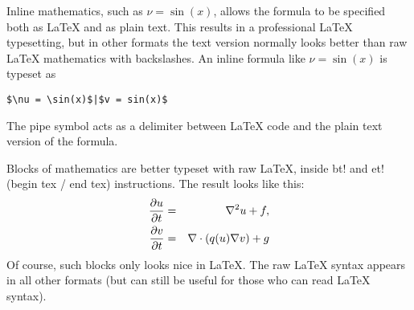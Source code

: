 \documentclass{article}
\begin{document}
Inline mathematics, such as $\nu = \sin(x)$,
allows the formula to be specified both as {\LaTeX} and as plain text.
This results in a professional {\LaTeX} typesetting, but in other formats
the text version normally looks better than raw {\LaTeX} mathematics with
backslashes. An inline formula like $\nu = \sin(x)$ is
typeset as
\begin{Verbatim}[fontsize=\fontsize{9pt}{9pt},tabsize=8,baselinestretch=0.85,
fontfamily=tt,xleftmargin=7mm]
$\nu = \sin(x)$|$v = sin(x)$
\end{Verbatim}
\noindent
The pipe symbol acts as a delimiter between {\LaTeX} code and the plain text
version of the formula.

Blocks of mathematics are better typeset with raw {\LaTeX}, inside
{\fontsize{10pt}{10pt}\verb!!bt!} and {\fontsize{10pt}{10pt}\verb!!et!} (begin tex / end tex) instructions. 
The result looks like this:
\begin{eqnarray}
{\partial u\over\partial t} &=& \nabla^2 u + f, \label{myeq1}\\
{\partial v\over\partial t} &=& \nabla\cdot(q(u)\nabla v) + g
\end{eqnarray}
Of course, such blocks only looks nice in {\LaTeX}. The raw
{\LaTeX} syntax appears in all other formats (but can still be useful
for those who can read {\LaTeX} syntax).
\end{document}
